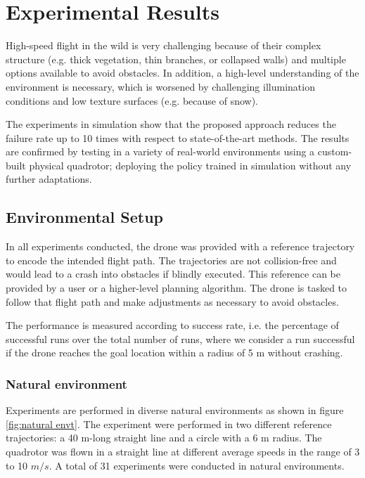 \chapter{Experimental Results}

High-speed flight in the wild is very challenging because of their complex structure (e.g. thick vegetation, thin branches, or collapsed walls) and multiple options available to avoid obstacles. In addition, a high-level understanding of the environment is necessary, which is worsened by challenging illumination conditions and low texture surfaces (e.g. because of snow). 

The experiments in simulation show that the proposed approach reduces the failure rate up to 10 times with respect to state-of-the-art methods. The results are confirmed by testing in a variety of real-world environments using a custom-built physical quadrotor;
deploying the policy
trained in simulation without any further adaptations. 

\section{Environmental Setup}

In all experiments conducted, the drone was provided with a reference trajectory to encode the intended
flight path. The trajectories are not collision-free and would lead to a crash into obstacles if blindly executed. This reference can be provided by a user or a higher-level planning algorithm. The drone is tasked to follow that flight path and make adjustments as necessary to avoid obstacles. 

The performance is measured according to success rate, i.e. the percentage of successful runs over the total number of runs, where we consider
a run successful if the drone reaches the goal location within a radius
of 5 m without crashing. 

\subsection{Natural environment}
Experiments are performed in diverse natural environments as shown in figure \ref{fig:natural envt}. The experiment were performed in two different reference trajectories:
a 40 m-long straight line and a circle with a 6 m radius. The quadrotor was flown in a straight line at
different average speeds in the range of 3 to 10 $m/s$. A total of 31 experiments were conducted in natural environments.

